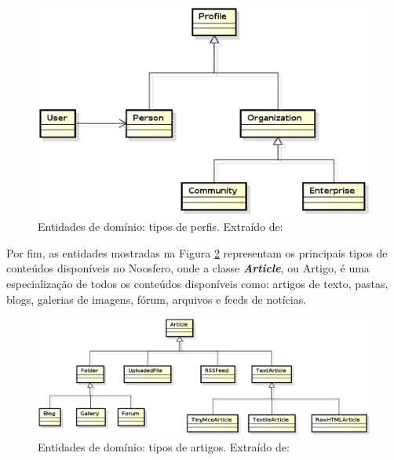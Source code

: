 \begin{figure}[h]
    \centering
    \includegraphics[keepaspectratio=true,scale=0.6]
      {figuras/domain_profiles.eps}
    \caption{Entidades de domínio: tipos de perfis. Extraído de: \cite{bucher2013rede}}
    \label{domain_profiles}
\end{figure}

Por fim, as entidades mostradas na Figura \ref{domain_articles} representam os principais tipos de conteúdos disponíveis no Noosfero, onde a classe \textbf{\textit{Article}}, ou Artigo, é uma especialização de todos os conteúdos disponíveis como: artigos de texto, pastas, blogs, galerias de imagens, fórum, arquivos e feeds de notícias.

\begin{figure}[h]
    \centering
    \includegraphics[keepaspectratio=true,scale=0.55]
      {figuras/domain_articles.eps}
    \caption{Entidades de domínio: tipos de artigos. Extraído de: \cite{bucher2013rede}}
    \label{domain_articles}
\end{figure}


